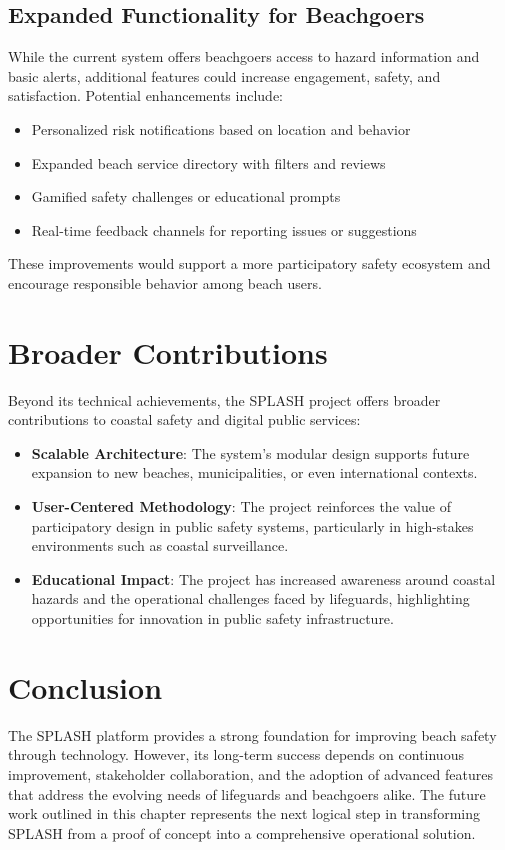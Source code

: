 \subsection{Expanded Functionality for Beachgoers}
While the current system offers beachgoers access to hazard information and basic alerts, additional features could increase engagement, safety, and satisfaction. Potential enhancements include:
\begin{itemize}
    \item Personalized risk notifications based on location and behavior
    \item Expanded beach service directory with filters and reviews
    \item Gamified safety challenges or educational prompts
    \item Real-time feedback channels for reporting issues or suggestions
\end{itemize}
These improvements would support a more participatory safety ecosystem and encourage responsible behavior among beach users.

\section{Broader Contributions}
Beyond its technical achievements, the SPLASH project offers broader contributions to coastal safety and digital public services:

\begin{itemize}
    \item \textbf{Scalable Architecture}: The system’s modular design supports future expansion to new beaches, municipalities, or even international contexts.
    \item \textbf{User-Centered Methodology}: The project reinforces the value of participatory design in public safety systems, particularly in high-stakes environments such as coastal surveillance.
    \item \textbf{Educational Impact}: The project has increased awareness around coastal hazards and the operational challenges faced by lifeguards, highlighting opportunities for innovation in public safety infrastructure.
\end{itemize}

\section{Conclusion}
The SPLASH platform provides a strong foundation for improving beach safety through technology. However, its long-term success depends on continuous improvement, stakeholder collaboration, and the adoption of advanced features that address the evolving needs of lifeguards and beachgoers alike. The future work outlined in this chapter represents the next logical step in transforming SPLASH from a proof of concept into a comprehensive operational solution.
